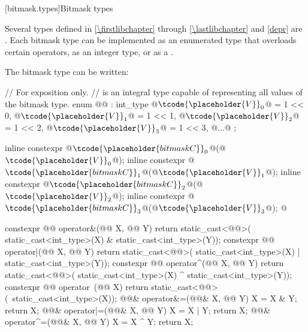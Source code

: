 [bitmask.types]{Bitmask types}

\pnum
Several types defined in \ref{\firstlibchapter} through \ref{\lastlibchapter}
and \ref{depr} are
.
Each bitmask type can be implemented as an
enumerated type that overloads certain operators, as an integer type,
or as a
.
%

\pnum
The bitmask type  can be written:

\begin{codeblock}
// For exposition only.
//  is an integral type capable of representing all values of the bitmask type.
enum @@ : int_type {
  @$\tcode{\placeholder{V}}_{0}$@ = 1 << 0, @$\tcode{\placeholder{V}}_{1}$@ = 1 << 1, @$\tcode{\placeholder{V}}_{2}$@ = 1 << 2, @$\tcode{\placeholder{V}}_{3}$@ = 1 << 3, @$\ldots$@
};

inline constexpr @$\tcode{\placeholder{bitmask C}}_{0}$@(@$\tcode{\placeholder{V}}_{0}{}$@);
inline constexpr @$\tcode{\placeholder{bitmask C}}_{1}$@(@$\tcode{\placeholder{V}}_{1}{}$@);
inline constexpr @$\tcode{\placeholder{bitmask C}}_{2}$@(@$\tcode{\placeholder{V}}_{2}{}$@);
inline constexpr @$\tcode{\placeholder{bitmask C}}_{3}$@(@$\tcode{\placeholder{V}}_{3}{}$@);
  @\vdots@

constexpr @@ operator&(@@ X, @@ Y) {
  return static_cast<@@>(
    static_cast<int_type>(X) & static_cast<int_type>(Y));
}
constexpr @@ operator|(@@ X, @@ Y) {
  return static_cast<@@>(
    static_cast<int_type>(X) | static_cast<int_type>(Y));
}
constexpr @@ operator^(@@ X, @@ Y) {
  return static_cast<@@>(
    static_cast<int_type>(X) ^ static_cast<int_type>(Y));
}
constexpr @@ operator~(@@ X) {
  return static_cast<@@>(~static_cast<int_type>(X));
}
@@& operator&=(@@& X, @@ Y) {
  X = X & Y; return X;
}
@@& operator|=(@@& X, @@ Y) {
  X = X | Y; return X;
}
@@& operator^=(@@& X, @@ Y) {
  X = X ^ Y; return X;
}
\end{codeblock}

